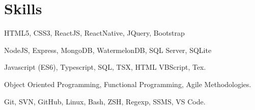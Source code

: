 \documentclass[a4paper,10pt]{article}
\begin{document}

\fancyhead[C]{
}



\section{Skills}

\begin{description}
    \setlength\itemsep{0.1pt}
    \item[Front End:] HTML5, CSS3, ReactJS, ReactNative, JQuery, Bootstrap
    \item[Back End:] NodeJS, Express, MongoDB, WatermelonDB, SQL Server, SQLite
    \item[Languages:] Javascript (ES6), Typescript, SQL, TSX, HTML VBScript, Tex.
    \item[Concepts:] Object Oriented Programming, Functional Programming, Agile Methodologies.
    \item[Miscellaneous:] Git, SVN, GitHub, Linux, Bash, ZSH, Regexp, SSMS, VS Code.
\end{description}
\end{document}

